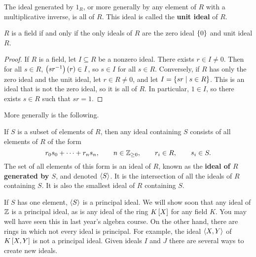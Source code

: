 \begin{note*}
The ideal generated by $ 1_R $, or more generally by any element of $ R $ with a multiplicative inverse, is all of $ R $. This ideal is called the \textbf{unit ideal} of $ R $.
\end{note*}

\begin{proposition}
$ R $ is a field if and only if the only ideals of $ R $ are the zero ideal $ \cb{0} $ and unit ideal $ R $.
\end{proposition}

\begin{proof}
If $ R $ is a field, let $ I \subseteq R $ be a nonzero ideal. There exists $ r \in I \ne 0 $. Then for all $ s \in R $, $ \rb{sr^{-1}}\rb{r} \in I $, so $ s \in I $ for all $ s \in R $. Conversely, if $ R $ has only the zero ideal and the unit ideal, let $ r \in R \ne 0 $, and let $ I = \cb{sr \mid s \in R} $. This is an ideal that is not the zero ideal, so it is all of $ R $. In particular, $ 1 \in I $, so there exists $ s \in R $ such that $ sr = 1 $.
\end{proof}

More generally is the following.

\begin{definition}
If $ S $ is a subset of elements of $ R $, then any ideal containing $ S $ consists of all elements of $ R $ of the form
$$ r_0s_0 + \dots + r_ns_n , \qquad n \in \Z_{\ge 0}, \qquad r_i \in R, \qquad s_i \in S. $$
The set of all elements of this form is an ideal of $ R $, known as the \textbf{ideal of $ R $ generated by $ S $}, and denoted $ \ab{S} $. It is the intersection of all the ideals of $ R $ containing $ S $. It is also the smallest ideal of $ R $ containing $ S $.
\end{definition}

If $ S $ has one element, $ \ab{S} $ is a principal ideal. We will show soon that any ideal of $ \Z $ is a principal ideal, as is any ideal of the ring $ K\sb{X} $ for any field $ K $. You may well have seen this in last year's
algebra course. On the other hand, there are rings in which not every ideal is principal. For example, the ideal $ \ab{X, Y} $ of $ K\sb{X, Y} $ is not a principal ideal. Given ideals $ I $ and $ J $ there are several ways to create new ideals.

